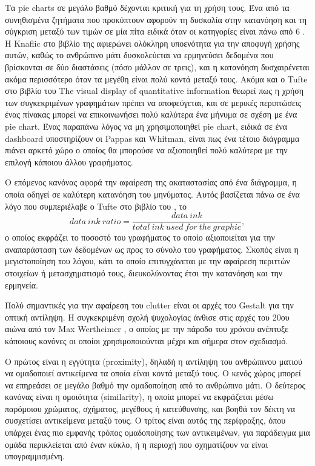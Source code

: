 \documentclass[greek, 12pt]{article}
\begin{document}
Τα pie charts σε μεγάλο βαθμό δέχονται κριτική για τη χρήση τους. Ένα από τα συνηθισμένα ζητήματα που προκύπτουν αφορούν τη δυσκολία στην κατανόηση και τη σύγκριση μεταξύ των τιμών σε μία πίτα ειδικά όταν οι κατηγορίες είναι πάνω από 6 \cite{annesley2010bars}. Η Knaflic στο βιβλίο της αφιερώνει ολόκληρη υποενότητα για την αποφυγή χρήσης αυτών, καθώς το ανθρώπινο μάτι δυσκολεύεται να ερμηνεύσει δεδομένα που βρίσκονται σε δύο διαστάσεις (πόσο μάλλον σε τρεις), και η κατανόηση δυσχαιρένεται ακόμα περισσότερο όταν τα μεγέθη είναι πολύ κοντά μεταξύ τους. \cite{knaflic2015storytelling} Ακόμα και ο Tufte στο βιβλίο του The visual display of quantitative information θεωρεί πως η χρήση των συγκεκριμένων γραφημάτων πρέπει να αποφεύγεται, και σε μερικές περιπτώσεις ένας πίνακας μπορεί να επικοινωνήσει πολύ καλύτερα ένα μήνυμα σε σχέση με ένα pie chart. \cite{tufte2001visual} Ένας παραπάνω λόγος να μη χρησιμοποιηθεί pie chart, ειδικά σε ένα dashboard υποστηρίζουν οι Pappas και Whitman, είναι πως ένα τέτοιο διάγραμμα πιάνει αρκετό χώρο ο οποίος θα μπορούσε να αξιοποιηθεί πολύ καλύτερα με την επιλογή κάποιου άλλου γραφήματος. \cite{pappas2011riding}

Ο επόμενος κανόνας αφορά την αφαίρεση της ακαταστασίας από ένα διάγραμμα, η οποία οδηγεί σε καλύτερη κατανόηση του μηνύματος. Αυτός βασίζεται πάνω σε ένα λόγο που συμπεριέλαβε ο Tufte στο βιβλίο του \cite{tufte2001visual}, το \[ data \ ink \ ratio = \frac{data \ ink}{total \ ink \ used \ for \ the \ graphic},\] ο οποίος εκφράζει το ποσοστό του γραφήματος το οποίο αξιοποιείται για την αναπαράσταση των δεδομένων ως προς το σύνολο του γραφήματος. Σκοπός είναι η μεγιστοποίηση του λόγου, κάτι το οποίο επιτυγχάνεται με την αφαίρεση περιττών στοιχείων ή μετασχηματισμό τους, διευκολύνοντας έτσι την κατανόηση και την ερμηνεία. \cite{knaflic2015storytelling}

Πολύ σημαντικές για την αφαίρεση του clutter είναι οι αρχές του Gestalt για την οπτική αντίληψη. Η συγκεκριμένη σχολή ψυχολογίας άνθισε στις αρχές του 20ου αιώνα από τον Max Wertheimer \cite{wagemans2012century1, wagemans2012century2}, ο οποίος με την πάροδο του χρόνου ανέπτυξε κάποιους κανόνες οι οποίοι χρησιμοποιούνται μέχρι και σήμερα στον σχεδιασμό. 

Ο πρώτος είναι η εγγύτητα (proximity), δηλαδή η αντίληψη του ανθρώπινου ματιού να ομαδοποιεί αντικείμενα τα οποία είναι κοντά μεταξύ τους. Ο κενός χώρος μπορεί να επηρεάσει σε μεγάλο βαθμό την ομαδοποίηση από το ανθρώπινο μάτι. Ο δεύτερος κανόνας είναι η ομοιότητα (similarity), η οποία μπορεί να εκφράζεται μέσω παρόμοιου χρώματος, σχήματος, μεγέθους ή κατεύθυνσης, και βοηθά τον δέκτη να συσχετίσει αντικείμενα μεταξύ τους. Ο τρίτος είναι αυτός της περίφραξης, όπου υπάρχει ένας πιο εμφανής τρόπος ομαδοποίησης των αντικειμένων, για παράδειγμα μια ομάδα περικλείεται από έναν κύκλο, ή η περιοχή που σχηματίζουν να είναι υπογραμμισμένη. \cite{knaflic2015storytelling, wagemans2012century1}
\end{document}
